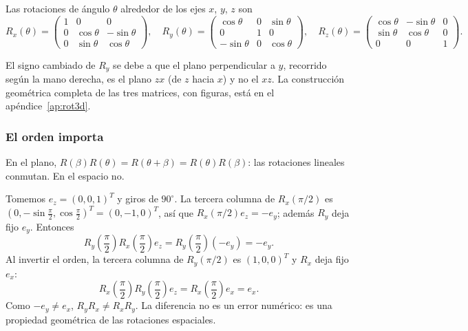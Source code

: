 \begin{definicion}
Las rotaciones de ángulo \(\theta\) alrededor de los ejes \(x\), \(y\), \(z\) son
\[
R_x(\theta)=
\begin{pmatrix}
1&0&0\\0&\cos\theta&-\sin\theta\\0&\sin\theta&\cos\theta
\end{pmatrix},\quad
R_y(\theta)=
\begin{pmatrix}
\cos\theta&0&\sin\theta\\0&1&0\\-\sin\theta&0&\cos\theta
\end{pmatrix},\quad
R_z(\theta)=
\begin{pmatrix}
\cos\theta&-\sin\theta&0\\
\sin\theta& \cos\theta&0\\
0&0&1
\end{pmatrix}.
\]
\end{definicion}

El signo cambiado de \(R_y\) se debe a que el plano perpendicular a \(y\), recorrido según la
mano derecha, es el plano \(zx\) (de \(z\) hacia \(x\)) y no el \(xz\). La construcción
geométrica completa de las tres matrices, con figuras, está en el
apéndice~\ref{ap:rot3d}.

\subsubsection{El orden importa}\label{sec:orden-importa}

En el plano, \(R(\beta)R(\theta)=R(\theta+\beta)=R(\theta)R(\beta)\): las rotaciones lineales
conmutan. En el espacio no.

\begin{ejemplo}
Tomemos \(e_z=(0,0,1)^T\) y giros de \(90^\circ\). La tercera columna de
\(R_x(\pi/2)\) es \((0,-\sin\tfrac{\pi}{2},\cos\tfrac{\pi}{2})^T=(0,-1,0)^T\), así que
\(R_x(\pi/2)e_z=-e_y\); además \(R_y\) deja fijo \(e_y\). Entonces
\[
R_y\left(\frac{\pi}{2}\right)
R_x\left(\frac{\pi}{2}\right)e_z
=R_y\left(\frac{\pi}{2}\right)(-e_y)
=-e_y.
\]
Al invertir el orden, la tercera columna de \(R_y(\pi/2)\) es \((1,0,0)^T\) y \(R_x\) deja
fijo \(e_x\):
\[
R_x\left(\frac{\pi}{2}\right)
R_y\left(\frac{\pi}{2}\right)e_z
=R_x\left(\frac{\pi}{2}\right)e_x
=e_x.
\]
Como \(-e_y\neq e_x\), \(R_yR_x\neq R_xR_y\). La diferencia no es un error numérico: es una
propiedad geométrica de las rotaciones espaciales.
\end{ejemplo}

